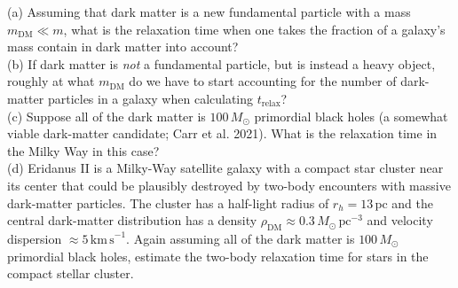 \documentclass[12pt]{article}
\begin{document}
(a) Assuming that dark matter is a new fundamental particle with a mass 
\(m_\mathrm{DM} \ll m\), what is the relaxation time when one takes the fraction of a 
galaxy's mass contain in dark matter into account?\\

(b) If dark matter is \emph{not} a fundamental particle, but is instead a heavy object, 
roughly at what \(m_\mathrm{DM}\) do we have to start accounting for the number of 
dark-matter particles in a galaxy when calculating \(t_\mathrm{relax}\)?\\

(c) Suppose all of the dark matter is \(100\,M_\odot\) primordial black holes 
(a somewhat viable dark-matter candidate; Carr et al. 2021). What is the relaxation 
time in the Milky Way in this case?\\

(d) Eridanus II is a Milky-Way satellite galaxy with a compact star cluster near its 
center that could be plausibly destroyed by two-body encounters with massive 
dark-matter particles. The cluster has a half-light radius of \(r_h = 13\,\mathrm{pc}\) 
and the central dark-matter distribution has a density 
\(\rho_\mathrm{DM} \approx 0.3\,M_\odot\,\mathrm{pc}^{-3}\) 
and velocity dispersion \(\approx 5\,\mathrm{km\,s}^{-1}\). Again assuming all of the 
dark matter is \(100\,M_\odot\) primordial black holes, estimate the two-body relaxation 
time for stars in the compact stellar cluster.
\end{document}
